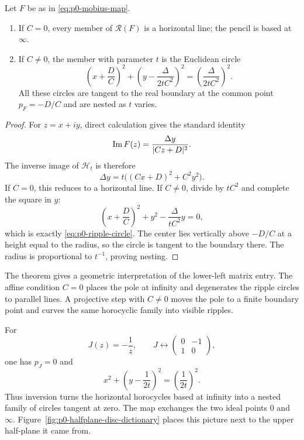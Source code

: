 \begin{theorem}
\label{thm:p0-ripple-pencil-formula}
Let $F$ be as in \eqref{eq:p0-mobius-map}.

\begin{enumerate}
  \item If $C=0$, every member of $\mathcal R(F)$ is a horizontal line; the
  pencil is based at $\infty$.

  \item If $C\ne0$, the member with parameter $t$ is the Euclidean circle
  \begin{equation}\label{eq:p0-ripple-circle}
    \left(x+\frac DC\right)^2
    +\left(y-\frac{\Delta}{2tC^2}\right)^2
    =\left(\frac{\Delta}{2tC^2}\right)^2.
  \end{equation}
  All these circles are tangent to the real boundary at the common point
  $p_F=-D/C$ and are nested as $t$ varies.
\end{enumerate}
\end{theorem}

\begin{proof}
For $z=x+iy$, direct calculation gives the standard identity
\begin{equation}\label{eq:p0-imaginary-mobius}
  \operatorname{Im} F(z)=\frac{\Delta y}{|Cz+D|^2}.
\end{equation}
The inverse image of $\mathcal H_t$ is therefore
\[
  \Delta y=t\bigl((Cx+D)^2+C^2y^2\bigr).
\]
If $C=0$, this reduces to a horizontal line.  If $C\ne0$, divide by
$tC^2$ and complete the square in $y$:
\[
  \left(x+\frac DC\right)^2+y^2
  -\frac{\Delta}{tC^2}y=0,
\]
which is exactly \eqref{eq:p0-ripple-circle}.  The center lies vertically
above $-D/C$ at a height equal to the radius, so the circle is tangent to the
boundary there.  The radius is proportional to $t^{-1}$, proving nesting.
\end{proof}

The theorem gives a geometric interpretation of the lower-left matrix entry.
The affine condition $C=0$ places the pole at infinity and degenerates the
ripple circles to parallel lines.  A projective step with $C\ne0$ moves the pole
to a finite boundary point and curves the same horocyclic family into visible
ripples.

\begin{example}
\label{ex:p0-inversion-ripples}
For
\[
  J(z)=-\frac1z,
  \qquad
  J\leftrightarrow
  \begin{pmatrix}0&-1\\1&0\end{pmatrix},
\]
one has $p_J=0$ and
\begin{equation}\label{eq:p0-inversion-circles}
  x^2+\left(y-\frac1{2t}\right)^2
  =\left(\frac1{2t}\right)^2.
\end{equation}
Thus inversion turns the horizontal horocycles based at infinity into a nested
family of circles tangent at zero.  The map exchanges the two ideal points
$0$ and $\infty$.  Figure~\ref{fig:p0-halfplane-disc-dictionary} places this
picture next to the upper half-plane it came from.
\end{example}

